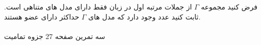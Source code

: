 فرض کنید مجموعه 
$\Gamma$
از جملات مرتبه اول در زبان 
فقط دارای مدل های متناهی است. ثابت کنید عدد 
وجود دارد که مدل های 
$\Gamma$
حداکثر دارای 
عضو هستند. 
\\
\\
سه تمرین صفحه 27 جزوه تمامیت
